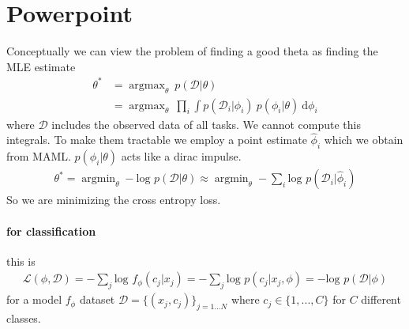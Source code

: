\documentclass{article}
\DeclareMathOperator*{\argmin}{argmin}
\DeclareMathOperator*{\argmax}{argmax}
\begin{document}
\section{Powerpoint}
Conceptually we can view the problem of finding a good theta as finding the MLE estimate
\begin{align}
	\theta^* &= \argmax_{\theta} \: p(\mathcal{D} \vert \theta) \\ 
	&= \argmax_{\theta} \: \prod_{i} \int p(\mathcal{D}_i \vert \phi_i) \: p(\phi_i \vert \theta) \: \text{d} \phi_i
\end{align}
where $\mathcal{D}$ includes the observed data of all tasks. We cannot compute this integrals. To make them tractable we employ a point estimate $\hat{\phi}_i$ which we obtain from MAML. $p(\phi_i \vert \theta)$ acts like a dirac impulse.
\begin{align}
	\theta^* = \argmin_{\theta}	- \text{log } p(\mathcal{D} \vert \theta) \approx \argmin_{\theta} - \sum_{i} \text{log } p(\mathcal{D}_i \vert \hat{\phi}_i)
\end{align}
So we are minimizing the cross entropy loss. 
\paragraph{for classification} this is 
\begin{align}
 \mathcal{L}(\phi, \mathcal{D}) =  - \sum_{j} \text{log } f_{\phi}(c_j \vert x_j) = - \sum_{j} \text{log } p(c_j \vert x_j, \phi) = - \text{log } p(\mathcal{D} \vert \phi)
\end{align}
for a model $f_{\phi}$ dataset $\mathcal{D} = \{(x_j, c_j)\}_{j=1...N}$ where $c_j \in \{1,...,C\}$ for $C$ different classes. 
\end{document}
